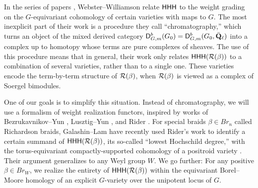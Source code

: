 \documentclass[a4paper,10pt,leqno]{amsart}
\theoremstyle{plain}
\theoremstyle{plain}
\theoremstyle{plain}
\theoremstyle{definition}
\theoremstyle{remark}
\newcommand{\Br}{\mathit{Br}}
\newcommand{\QL}{\bar{\mathbf{Q}}_\ell}
\begin{document}
In the series of papers \cite{ww_2008, ww_2011, ww_2017}, Webster--Williamson relate $\sf{HHH}$ to the weight grading on the $G$-equivariant cohomology of certain varieties with maps to $G$.
The most inexplicit part of their work is a procedure they call ``chromatography,'' which turns an object of the mixed derived category $\sf{D}_{G, m}^b(G_0) = \sf{D}_{G, m}^b(G_0, \QL)$ into a complex up to homotopy whose terms are pure complexes of sheaves.
The use of this procedure means that in general, their work only relates $\sf{HHH}(\cal{R}(\beta))$ to a combination of several varieties, rather than to a single one.
These varieties encode the term-by-term structure of $\cal{R}(\beta)$, when $\cal{R}(\beta)$ is viewed as a complex of Soergel bimodules.

One of our goals is to simplify this situation.
Instead of chromatography, we will use a formalism of weight realization functors, inspired by works of Bezrukavnikov--Yun \cite{by}, Lusztig--Yun \cite{ly_2020}, and Rider \cite{rider}.
For special braids $\beta \in \Br_n$ called Richardson braids, Galashin--Lam have recently used Rider's work to identify a certain summand of $\sf{HHH}(\cal{R}(\beta))$, its so-called ``lowest Hochschild degree,'' with the torus-equivariant compactly-supported cohomology of a positroid variety \cite{gl}.
Their argument generalizes to any Weyl group $W$.
We go further:
For any positive $\beta \in \Br_W$, we realize the entirety of $\sf{HHH}(\cal{R}(\beta))$ within the equivariant Borel--Moore homology of an explicit $G$-variety over the unipotent locus of $G$.
\end{document}
